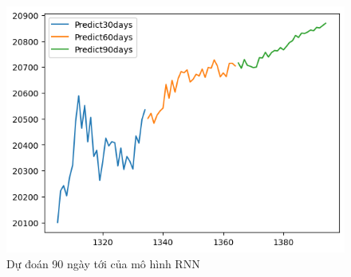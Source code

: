 \begin{figure}[H]
\begin{minipage}{0.15\textwidth}
    \includegraphics[width=1\textwidth]{resources/chapter-5/newdata1/predicted/EIB_ RNN_9-1_30days.png}
    \end{minipage}
    \hfill
    
    \caption{Dự đoán 90 ngày tới của mô hình RNN}
    \label{fig:RNN_predicted}
\end{figure}




